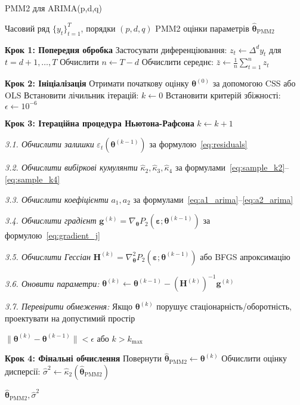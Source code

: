 \documentclass[12pt,a4paper]{article}
\begin{document}
\begin{algorithm}[H]
\caption{PMM2 для ARIMA(p,d,q)}
\label{alg:pmm2_arima}
\begin{algorithmic}[1]
\REQUIRE Часовий ряд $\{y_t\}_{t=1}^T$, порядки $(p, d, q)$
\ENSURE PMM2 оцінки параметрів $\hat{\boldsymbol{\theta}}_{\text{PMM2}}$

\STATE \textbf{Крок 1: Попередня обробка}
\STATE Застосувати диференціювання: $z_t \leftarrow \Delta^d y_t$ для $t = d+1, \ldots, T$
\STATE Обчислити $n \leftarrow T - d$
\STATE Обчислити середнє: $\bar{z} \leftarrow \frac{1}{n}\sum_{t=1}^{n} z_t$

\STATE \textbf{Крок 2: Ініціалізація}
\STATE Отримати початкову оцінку $\boldsymbol{\theta}^{(0)}$ за допомогою CSS або OLS
\STATE Встановити лічильник ітерацій: $k \leftarrow 0$
\STATE Встановити критерій збіжності: $\epsilon \leftarrow 10^{-6}$

\STATE \textbf{Крок 3: Ітераційна процедура Ньютона-Рафсона}
\REPEAT
    \STATE $k \leftarrow k + 1$

    \STATE \textit{3.1. Обчислити залишки} $\varepsilon_t(\boldsymbol{\theta}^{(k-1)})$ за формулою~\eqref{eq:residuals}

    \STATE \textit{3.2. Обчислити вибіркові кумулянти} $\hat{\kappa}_2, \hat{\kappa}_3, \hat{\kappa}_4$ за формулами~\eqref{eq:sample_k2}--\eqref{eq:sample_k4}

    \STATE \textit{3.3. Обчислити коефіцієнти} $a_1, a_2$ за формулами~\eqref{eq:a1_arima}--\eqref{eq:a2_arima}

    \STATE \textit{3.4. Обчислити градієнт} $\mathbf{g}^{(k)} = \nabla_{\boldsymbol{\theta}} P_2(\boldsymbol{\varepsilon}; \boldsymbol{\theta}^{(k-1)})$ за формулою~\eqref{eq:gradient_j}

    \STATE \textit{3.5. Обчислити Гессіан} $\mathbf{H}^{(k)} = \nabla^2_{\boldsymbol{\theta}} P_2(\boldsymbol{\varepsilon}; \boldsymbol{\theta}^{(k-1)})$ або BFGS апроксимацію

    \STATE \textit{3.6. Оновити параметри:} $\boldsymbol{\theta}^{(k)} \leftarrow \boldsymbol{\theta}^{(k-1)} - (\mathbf{H}^{(k)})^{-1} \mathbf{g}^{(k)}$

    \STATE \textit{3.7. Перевірити обмеження:} Якщо $\boldsymbol{\theta}^{(k)}$ порушує стаціонарність/оборотність, проектувати на допустимий простір

\UNTIL $\|\boldsymbol{\theta}^{(k)} - \boldsymbol{\theta}^{(k-1)}\| < \epsilon$ або $k > k_{\max}$

\STATE \textbf{Крок 4: Фінальні обчислення}
\STATE Повернути $\hat{\boldsymbol{\theta}}_{\text{PMM2}} \leftarrow \boldsymbol{\theta}^{(k)}$
\STATE Обчислити оцінку дисперсії: $\hat{\sigma}^2 \leftarrow \hat{\kappa}_2(\hat{\boldsymbol{\theta}}_{\text{PMM2}})$

\RETURN $\hat{\boldsymbol{\theta}}_{\text{PMM2}}, \hat{\sigma}^2$
\end{algorithmic}
\end{algorithm}
\end{document}
